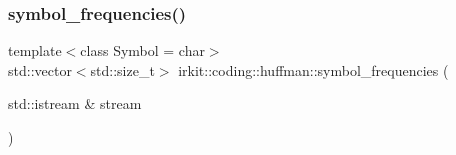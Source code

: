\subsubsection{\texorpdfstring{symbol\+\_\+frequencies()}{symbol\_frequencies()}}
{\footnotesize\ttfamily template$<$class Symbol  = char$>$ \\
std\+::vector$<$std\+::size\+\_\+t$>$ irkit\+::coding\+::huffman\+::symbol\+\_\+frequencies (\begin{DoxyParamCaption}\item[{std\+::istream \&}]{stream }\end{DoxyParamCaption})}

